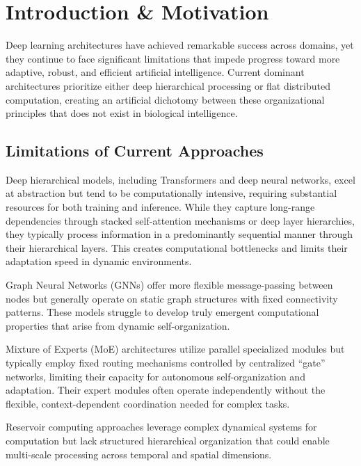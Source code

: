 \documentclass[11pt,a4paper,twocolumn]{article}
\begin{document}
\section{Introduction \& Motivation}

Deep learning architectures have achieved remarkable success across domains, yet they continue to face significant limitations that impede progress toward more adaptive, robust, and efficient artificial intelligence. Current dominant architectures prioritize either deep hierarchical processing or flat distributed computation, creating an artificial dichotomy between these organizational principles that does not exist in biological intelligence.

\subsection{Limitations of Current Approaches}

Deep hierarchical models, including Transformers \cite{vaswani2017attention} and deep neural networks, excel at abstraction but tend to be computationally intensive, requiring substantial resources for both training and inference. While they capture long-range dependencies through stacked self-attention mechanisms or deep layer hierarchies, they typically process information in a predominantly sequential manner through their hierarchical layers. This creates computational bottlenecks and limits their adaptation speed in dynamic environments.

Graph Neural Networks (GNNs) \cite{zhou2020graph} offer more flexible message-passing between nodes but generally operate on static graph structures with fixed connectivity patterns. These models struggle to develop truly emergent computational properties that arise from dynamic self-organization.

Mixture of Experts (MoE) architectures \cite{eigen2013learning} utilize parallel specialized modules but typically employ fixed routing mechanisms controlled by centralized ``gate'' networks, limiting their capacity for autonomous self-organization and adaptation. Their expert modules often operate independently without the flexible, context-dependent coordination needed for complex tasks.

Reservoir computing approaches \cite{lukosevicius2009reservoir} leverage complex dynamical systems for computation but lack structured hierarchical organization that could enable multi-scale processing across temporal and spatial dimensions.
\end{document}
